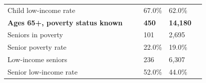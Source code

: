 \documentclass[9pt]{report}
\begin{document}
\begin{tabular}{p{.10in}p{.10in}p{.10in}p{3.7in}>{\hfill}p{.85in}>{\hfill}p{.85in}>{\hfill}p{.85in}>{\hfill}p{.85in}p{0.1in}}
\multicolumn{4}{l}{\parbox{3.6in}{\strut\raggedright{{Child low-income rate}}\strut}} &  &  & 67.0\% & 62.0\% & \multicolumn{1}{l}{}  \\ 
\multicolumn{4}{l}{\parbox{3.5in}{\strut\raggedright{\textbf{Ages 65+, poverty status known}\strut}}} & \textbf{} & \textbf{} & \textbf{450} & \textbf{14,180} & \textbf{} \\ 
\multicolumn{4}{l}{\parbox{3.6in}{\strut\raggedright{{Seniors in poverty}}\strut}} &  &  & 101 & 2,695 & \multicolumn{1}{l}{}  \\ 
\multicolumn{4}{l}{\parbox{3.6in}{\strut\raggedright{{Senior poverty rate}}\strut}} &  &  & 22.0\% & 19.0\% & \multicolumn{1}{l}{}  \\ 
\multicolumn{4}{l}{\parbox{3.6in}{\strut\raggedright{{Low-income seniors}}\strut}} &  &  & 236 & 6,307 & \multicolumn{1}{l}{}  \\ 
\multicolumn{4}{l}{\parbox{3.6in}{\strut\raggedright{{Senior low-income rate}}\strut}} &  &  & 52.0\% & 44.0\% & \multicolumn{1}{l}{}  \\ 

\end{tabular}
\setlength{\tabcolsep}{6pt} %
\end{document}
